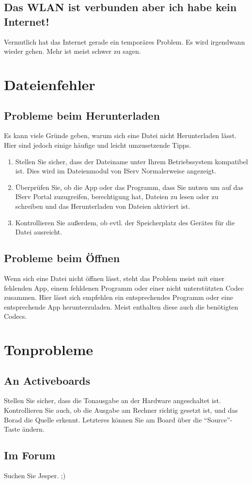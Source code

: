\documentclass[12pt, a4paper]{article}
\begin{document}
  \subsection{Das WLAN ist verbunden aber ich habe kein Internet!}
  Vermutlich hat das Internet gerade ein temporäres Problem. 
  Es wird irgendwann wieder gehen.
  Mehr ist meist schwer zu sagen.

  \section{Dateienfehler}
    
  \subsection{Probleme beim Herunterladen}
    Es kann viele Gründe geben, warum sich eine Datei nicht Herunterladen lässt. Hier sind jedoch einige häufige und leicht umzusetzende Tipps.
    \begin{enumerate}
      \item Stellen Sie sicher, dass der Dateiname unter Ihrem Betriebssystem kompatibel ist. Dies wird im Dateienmodul von IServ Normalerweise angezeigt.
      \item Überprüfen Sie, ob die App oder das Programm, dass Sie nutzen um auf das IServ Portal zuzugreifen, berechtigung hat, Dateien zu lesen oder zu schreiben und das Herunterladen von Dateien aktiviert ist.
      \item Kontrollieren Sie außerdem, ob evtl. der Speicherplatz des Gerätes für die Datei ausreicht.
    \end{enumerate}
    
  \subsection{Probleme beim Öffnen}
  Wenn sich eine Datei nicht öffnen lässt, steht das Problem meist mit einer fehlenden App, einem fehldenen Programm oder einer nicht unterstützten Codec zusammen.
  Hier lässt sich empfehlen ein entsprechendes Programm oder eine entsprechende App herunterzuladen. Meist enthalten diese auch die benötigten Codecs.

  \section{Tonprobleme}

  \subsection{An Activeboards}
  Stellen Sie sicher, dass die Tonausgabe an der Hardware angeschaltet ist.
  Kontrollieren Sie auch, ob die Ausgabe am Rechner richtig gesetzt ist, und das Borad die Quelle erkennt. Letzteres können Sie am Board über die "`Source"'-Taste ändern.

  \subsection{Im Forum}
  Suchen Sie Jesper. ;)
    
\end{document}
